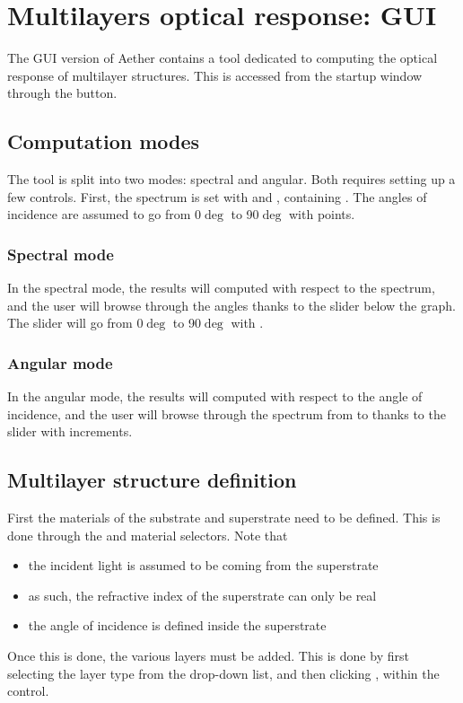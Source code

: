 \chapter{Multilayers optical response: GUI}

The GUI version of Aether contains a tool dedicated to computing the optical response of multilayer structures. This is accessed from the startup window through the  button.

\section{Computation modes}

The tool is split into two modes: spectral and angular. Both requires setting up a few controls. First, the spectrum is set with  and , containing . The angles of incidence are assumed to go from 0$\deg$ to 90$\deg$ with  points.

\subsection{Spectral mode}

In the spectral mode, the results will computed with respect to the spectrum, and the user will browse through the angles thanks to the slider below the graph. The slider will go from 0$\deg$ to 90$\deg$ with .

\subsection{Angular mode}

In the angular mode, the results will computed with respect to the angle of incidence, and the user will browse through the spectrum from  to  thanks to the slider with  increments.

\section{Multilayer structure definition}

First the materials of the substrate and superstrate need to be defined. This is done through the  and  material selectors. Note that
\begin{itemize}
	\item the incident light is assumed to be coming from the superstrate
	\item as such, the refractive index of the superstrate can only be real
	\item the angle of incidence is defined inside the superstrate
\end{itemize}
Once this is done, the various layers must be added. This is done by first selecting the layer type from the drop-down list, and then clicking , within the  control.

